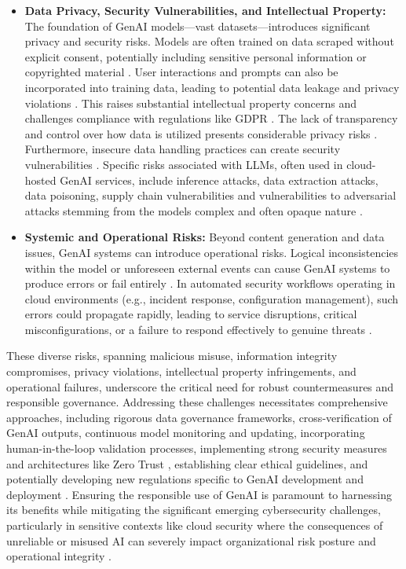 \begin{itemize}
    \item \textbf{Data Privacy, Security Vulnerabilities, and Intellectual Property:} The foundation of GenAI models—vast datasets—introduces significant privacy and security risks. Models are often trained on data scraped without explicit consent, potentially including sensitive personal information or copyrighted material \cite{nyoto_cyber_2024}. User interactions and prompts can also be incorporated into training data, leading to potential data leakage and privacy violations \cite{nyoto_cyber_2024}. This raises substantial intellectual property concerns and challenges compliance with regulations like GDPR \cite{nyoto_cyber_2024}. The lack of transparency and control over how data is utilized presents considerable privacy risks \cite{nyoto_cyber_2024}. Furthermore, insecure data handling practices can create security vulnerabilities \cite{surathunmanun_exploring_2024}. Specific risks associated with LLMs, often used in cloud-hosted GenAI services, include inference attacks, data extraction attacks, data poisoning, supply chain vulnerabilities \cite{surathunmanun_exploring_2024} and vulnerabilities to adversarial attacks stemming from the models complex and often opaque nature \cite{noauthor_zero-trust_nodate}.

    \item \textbf{Systemic and Operational Risks:} Beyond content generation and data issues, GenAI systems can introduce operational risks. Logical inconsistencies within the model or unforeseen external events can cause GenAI systems to produce errors or fail entirely \cite{surathunmanun_exploring_2024}. In automated security workflows operating in cloud environments (e.g., incident response, configuration management), such errors could propagate rapidly, leading to service disruptions, critical misconfigurations, or a failure to respond effectively to genuine threats \cite{surathunmanun_exploring_2024}.
\end{itemize}

These diverse risks, spanning malicious misuse, information integrity compromises, privacy violations, intellectual property infringements, and operational failures, underscore the critical need for robust countermeasures and responsible governance. Addressing these challenges necessitates comprehensive approaches, including rigorous data governance frameworks, cross-verification of GenAI outputs, continuous model monitoring and updating, incorporating human-in-the-loop validation processes, implementing strong security measures \cite{surathunmanun_exploring_2024} and architectures like Zero Trust \cite{surathunmanun_exploring_2024, noauthor_zero-trust_nodate}, establishing clear ethical guidelines, and potentially developing new regulations specific to GenAI development and deployment \cite{nyoto_cyber_2024}. Ensuring the responsible use of GenAI is paramount to harnessing its benefits while mitigating the significant emerging cybersecurity challenges, particularly in sensitive contexts like cloud security where the consequences of unreliable or misused AI can severely impact organizational risk posture and operational integrity \cite{surathunmanun_exploring_2024}.

